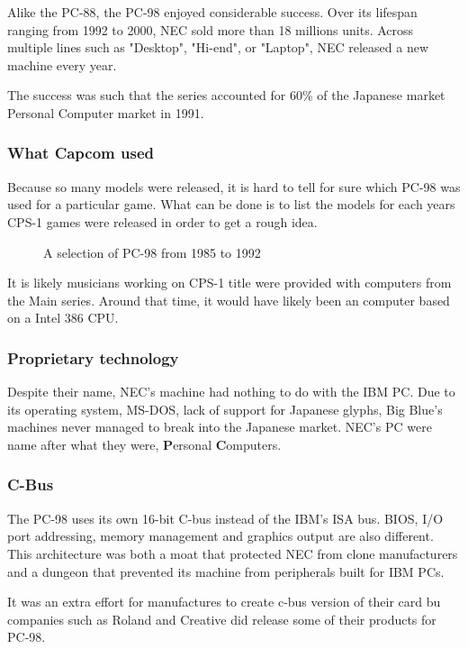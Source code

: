Alike the PC-88, the PC-98 enjoyed considerable success. Over its lifespan ranging from 1992 to 2000, NEC sold more than 18 millions units. Across multiple lines such as "Desktop", "Hi-end", or "Laptop", NEC released a new machine every year\cite{9800lines}. 

The success was such that the series accounted for 60\% of the Japanese market Personal Computer market in 1991. 



\subsubsection{What Capcom used}
Because so many models were released, it is hard to tell for sure which PC-98 was used for a particular game. What can be done is to list the models for each years CPS-1 games were released in order to get a rough idea.

\begin{figure}[H]
\caption*{A selection of PC-98 from 1985 to 1992}
\end{figure}

It is likely musicians working on CPS-1 title were provided with computers from the Main series. Around that time, it would have likely been an computer based on a Intel 386 CPU.


\subsubsection{Proprietary technology}

Despite their name, NEC's machine had nothing to do with the IBM PC. Due to its operating system, MS-DOS, lack of support for Japanese glyphs, Big Blue’s machines never managed to break into the
Japanese market. NEC's PC were name after what they were, \textbf{P}ersonal \textbf{C}omputers.


\subsubsection{C-Bus}
The PC-98 uses its own 16-bit C-bus instead of the IBM's ISA bus. BIOS, I/O port addressing, memory management and graphics output are also different. This architecture was both a moat that protected NEC from clone manufacturers and a dungeon that prevented its machine from peripherals built for IBM PCs.


It was an extra effort for manufactures to create c-bus version of their card bu companies such as Roland and Creative did release some of their products for PC-98.

